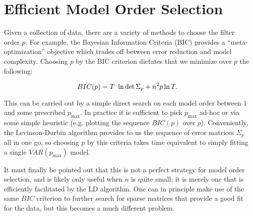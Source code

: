 \documentclass[12pt]{article}
\begin{document}
\section{Efficient Model Order Selection}
Given a collection of data, there are a variety of methods to choose
the filter order $p$.  For example, the Bayesian Information Criteria
(BIC) provides a ``meta-optimization'' objective which trades off
between error reduction and model complexity.  Choosing $p$ by the
BIC criterion dictates that we minimize over $p$ the following:

\begin{equation}
  \label{eqn:bic}
    BIC(p) = T\ \ln \det \Sigma_p + n^2 p \ln T.\\
\end{equation}

This can be carried out by a simple direct search on each model order
between $1$ and some prescribed $p_\text{max}$.  In practice it is
sufficient to pick $p_\text{max}$ ad-hoc or via some simple heuristic
(e.g. plotting the sequence $BIC(p)$ over $p$).  Conveniently, the
Levinson-Durbin algorithm provides to us the sequence of error
matrices $\Sigma_p$ all in one go, so choosing $p$ by this criteria
takes time equivalent to simply fitting a single $VAR(p_{\text{max}})$
model.

It must finally be pointed out that this is not a perfect strategy for
model order selection, and is likely only useful when $n$ is quite
small; it is merely one that is efficiently facilitated by the LD
algorithm.  One can in principle make use of the same $BIC$ criterion
to further search for sparse matrices that provide a good fit for the
data, but this becomes a much different problem.
\end{document}
